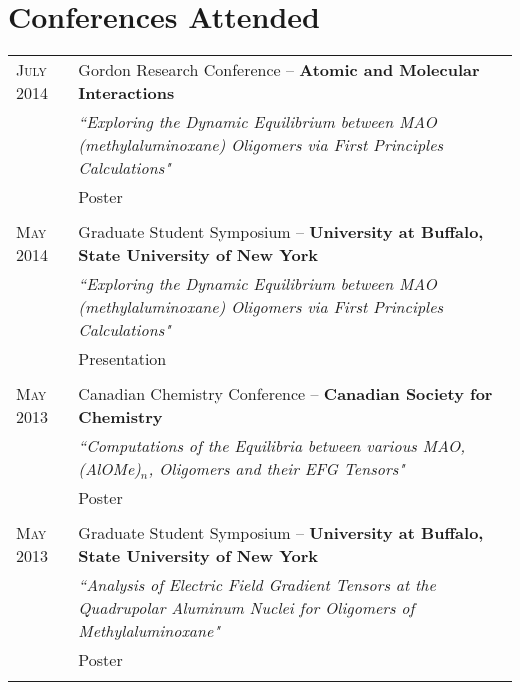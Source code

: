 \documentclass[letterpaper,10pt]{article} %
\begin{document}
\section{Conferences Attended}
\noindent 
\begin{tabular}{R{3cm}|p{13cm}} 

\textsc{July} 2014 & Gordon Research Conference -- \textbf{Atomic and Molecular Interactions} \\
& \small{\emph{``Exploring the Dynamic Equilibrium between MAO (methylaluminoxane) Oligomers via First Principles Calculations"}} \\
& \small Poster \\
 \\


\textsc{May} 2014 & Graduate Student Symposium -- \textbf{University at Buffalo, State University of New York} \\
& \small{\emph{``Exploring the Dynamic Equilibrium between MAO (methylaluminoxane) Oligomers via First Principles Calculations"}} \\
& \small Presentation \\
 \\


\textsc{May} 2013 & Canadian Chemistry Conference -- \textbf{Canadian Society for Chemistry} \\
& \small{\emph{``Computations of the Equilibria between various MAO, (AlOMe)$_n$, Oligomers and their EFG Tensors"}} \\
& \small Poster \\
 \\


\textsc{May} 2013 & Graduate Student Symposium -- \textbf{University at Buffalo, State University of New York} \\
& \small{\emph{``Analysis of Electric Field Gradient Tensors at the Quadrupolar Aluminum Nuclei for Oligomers of Methylaluminoxane"}} \\
& \small Poster \\
 \\



\end{tabular}
\end{document}
